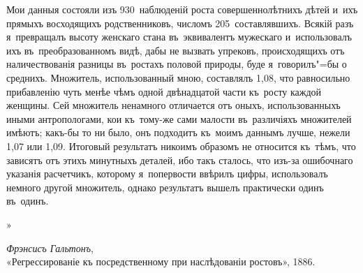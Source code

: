 \documentclass[11pt]{article}
\begin{document}
Мои данныя состояли изъ 930~наблюденій роста совершеннолѣтнихъ дѣтей и~ихъ прямыхъ восходящихъ родственниковъ, числомъ 205~составлявшихъ. Всякій разъ я~превращалъ высоту женскаго стана въ~эквивалентъ мужескаго и~использовалъ ихъ въ~преобразованномъ видѣ, дабы не вызвать упрековъ, происходящихъ отъ наличествованія разницы въ~ростахъ половой природы, буде я~говорилъ"=бы о среднихъ. Множитель, использованный мною, составлялъ 1,08, что равносильно прибавленію чуть менѣе чѣмъ одной двѣнадцатой части къ~росту каждой женщины. Сей множитель ненамного отличается отъ оныхъ, использованныхъ иными антропологами, кои къ~тому-же сами малости въ~различіяхъ множителей имѣютъ; какъ-бы то ни было, онъ подходитъ къ~моимъ даннымъ лучше, нежели 1,07 или 1,09. Итоговый результатъ никоимъ образомъ не относится къ~тѣмъ, что зависятъ отъ этихъ минутныхъ деталей, ибо такъ сталось, что изъ-за ошибочнаго указанія расчетчикъ, которому я~попервости ввѣрилъ цифры, использовалъ немного другой множитель, однако результатъ вышелъ практически одинъ въ~одинъ. 

{\hfill \huge»}
\begin{flushright}
	\textit{Фрэнсисъ Гальтонъ}, \\
	«Регрессированіе къ посредственному при наслѣдованіи ростовъ», 1886.
\end{flushright}
	

	
\end{document}
